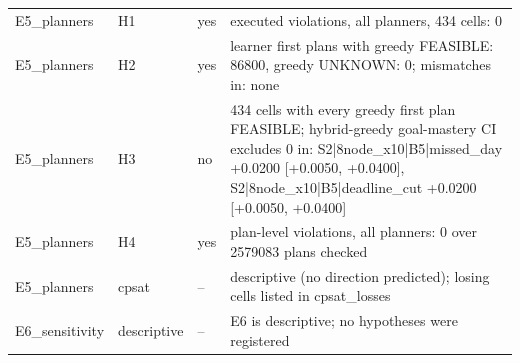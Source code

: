 \begin{table}[htbp]
\begin{tabular}{llll}
E5\_planners & H1 & yes & executed violations, all planners, 434 cells: 0 \\
E5\_planners & H2 & yes & learner first plans with greedy FEASIBLE: 86800, greedy UNKNOWN: 0; mismatches in: none \\
E5\_planners & H3 & no & 434 cells with every greedy first plan FEASIBLE; hybrid-greedy goal-mastery CI excludes 0 in: S2|8node\_x10|B5|missed\_day +0.0200 [+0.0050, +0.0400], S2|8node\_x10|B5|deadline\_cut +0.0200 [+0.0050, +0.0400] \\
E5\_planners & H4 & yes & plan-level violations, all planners: 0 over 2579083 plans checked \\
E5\_planners & cpsat & -- & descriptive (no direction predicted); losing cells listed in cpsat\_losses \\
E6\_sensitivity & descriptive & -- & E6 is descriptive; no hypotheses were registered \\
\bottomrule
\end{tabular}
\end{table}
